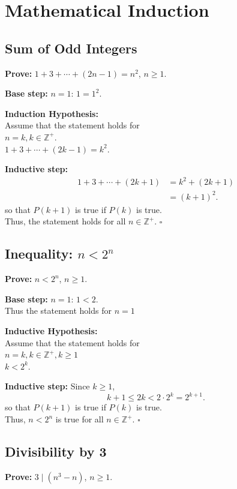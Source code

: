 \section{Mathematical Induction}
\vspace{-0.5em}

\subsection{Sum of Odd Integers}
\textbf{Prove:}
$1+3+\cdots+(2n-1)=n^2$, $n\geq1$.

\textbf{Base step:} $n=1$: $1=1^2$.

\textbf{Induction Hypothesis:} \\ 
Assume that the statement holds for \\ $n=k, k \in \mathbb{Z}^{+}$. \\
$1+3+\cdots+(2k-1)=k^2$.

\textbf{Inductive step:}
\[
\begin{aligned}
1+3+\cdots+(2k+1)
&=k^2+(2k+1)\\
&=(k+1)^2.
\end{aligned}
\]
so that $P(k+1)$ is true if $P(k)$ is true. \\
Thus, the statement holds for all $n \in \mathbb{Z}^{+}$. $\square$

\subsection{Inequality: $n<2^n$}
\textbf{Prove:} $n<2^n$, $n\geq1$.

\textbf{Base step:} $n=1$: $1<2$. \\
Thus the statement holds for $n=1$

\textbf{Inductive Hypothesis:} \\ 
Assume that the statement holds for \\ 
$n=k, k \in \mathbb{Z}^{+}, k\geq1$ \\
$k<2^k$.

\textbf{Inductive step:} Since $k\geq1$,
\[
k+1\leq2k<2\cdot2^k=2^{k+1}.
\]
so that $P(k+1)$ is true if $P(k)$ is true. \\
Thus, $n<2^{n}$ is true for all $n\in\mathbb{Z}^{+}$. $\square$

\subsection{Divisibility by 3}
\textbf{Prove:} $3\mid(n^3-n)$, $n\geq1$.


